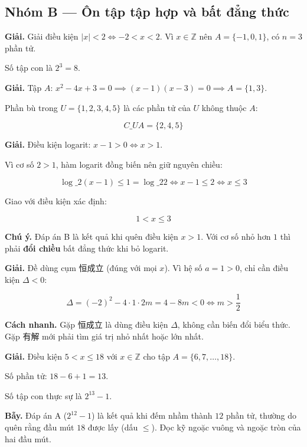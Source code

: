 \documentclass[11pt, a4paper]{article}
\begin{document}
\subsection*{Nhóm B — Ôn tập tập hợp và bất đẳng thức}

\begin{dapan}[19 — Đáp án D]
\textbf{Giải.} Giải điều kiện $|x| < 2 \iff -2 < x < 2$. Vì $x \in \mathbb{Z}$ nên $A = \{-1, 0, 1\}$, có $n = 3$ phần tử.

Số tập con là $2^3 = 8$.
\end{dapan}

\begin{dapan}[20 — Đáp án B]
\textbf{Giải.} Tập $A$: $x^2 - 4x + 3 = 0 \implies (x-1)(x-3) = 0 \implies A = \{1, 3\}$.

Phần bù trong $U = \{1,2,3,4,5\}$ là các phần tử của $U$ không thuộc $A$:

$$C\_U A = \{2, 4, 5\}$$
\end{dapan}

\begin{dapan}[21 — Đáp án C]
\textbf{Giải.} Điều kiện logarit: $x - 1 > 0 \iff x > 1$.

Vì cơ số $2 > 1$, hàm logarit đồng biến nên giữ nguyên chiều:

$$\log\_2(x-1) \le 1 = \log\_2 2 \iff x - 1 \le 2 \iff x \le 3$$

Giao với điều kiện xác định:

$$1 < x \le 3$$

\textbf{Chú ý.} Đáp án B là kết quả khi quên điều kiện $x > 1$. Với cơ số nhỏ hơn $1$ thì phải \textbf{đổi chiều} bất đẳng thức khi bỏ logarit.
\end{dapan}

\begin{dapan}[22 — Đáp án A]
\textbf{Giải.} Đề dùng cụm 恒成立 (đúng với mọi $x$). Vì hệ số $a = 1 > 0$, chỉ cần điều kiện $\Delta < 0$:

$$\Delta = (-2)^2 - 4 \cdot 1 \cdot 2m = 4 - 8m < 0 \iff m > \frac{1}{2}$$

\textbf{Cách nhanh.} Gặp 恒成立 là dùng điều kiện $\Delta$, không cần biến đổi biểu thức. Gặp 有解 mới phải tìm giá trị nhỏ nhất hoặc lớn nhất.
\end{dapan}

\begin{dapan}[23 — Đáp án B]
\textbf{Giải.} Điều kiện $5 < x \le 18$ với $x \in \mathbb{Z}$ cho tập $A = \{6, 7, \ldots, 18\}$.

Số phần tử: $18 - 6 + 1 = 13$.

Số tập con thực sự là $2^{13} - 1$.

\textbf{Bẫy.} Đáp án A ($2^{12}-1$) là kết quả khi đếm nhầm thành $12$ phần tử, thường do quên rằng đầu mút $18$ được lấy (dấu $\le$). Đọc kỹ ngoặc vuông và ngoặc tròn của hai đầu mút.
\end{dapan}
\end{document}
